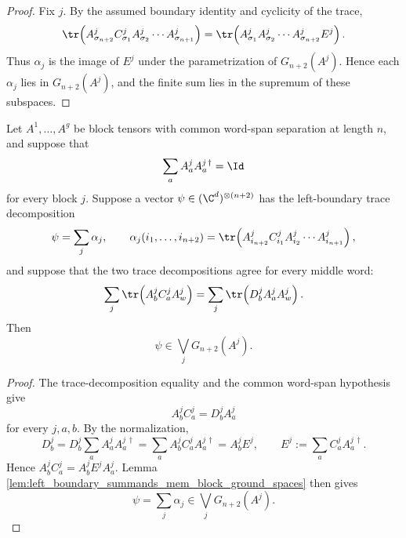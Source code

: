 \begin{proof}
    \leanok
    Fix $j$.  By the assumed boundary identity and cyclicity of the
    trace,
    \[
        \tr\!\left(
        A^j_{\sigma_{n+2}} C^j_{\sigma_1}
        A^j_{\sigma_2}\cdots A^j_{\sigma_{n+1}}
        \right)
        =
        \tr\!\left(
        A^j_{\sigma_1}A^j_{\sigma_2}\cdots
        A^j_{\sigma_{n+2}}E^j
        \right).
    \]
    Thus $\alpha_j$ is the image of $E^j$ under the parametrization
    of $G_{n+2}(A^j)$.  Hence each $\alpha_j$ lies in
    $G_{n+2}(A^j)$, and the finite sum lies in the supremum of these
    subspaces.
\end{proof}

\begin{lemma}
    \label{lem:left_boundary_trace_decomposition_mem_block_ground_spaces}
    \leanok
    Let $A^1,\ldots,A^g$ be block tensors with common word-span separation at
    length $n$, and suppose that
    \[
        \sum_a A^j_a A^{j\,\dagger}_a=\Id
    \]
    for every block $j$.  Suppose a vector $\psi\in(\C^d)^{\otimes(n+2)}$
    has the left-boundary trace decomposition
    \[
        \psi=\sum_j\alpha_j,
        \qquad
        \alpha_j(i_1,\ldots,i_{n+2})
        =
        \tr\!\left(
        A^j_{i_{n+2}} C^j_{i_1}
        A^j_{i_2}\cdots A^j_{i_{n+1}}
        \right),
    \]
    and suppose that the two trace decompositions agree for every middle word:
    \[
        \sum_j
        \tr\!\left(
        A^j_b C^j_a A^j_w
        \right)
        =
        \sum_j
        \tr\!\left(
        D^j_b A^j_a A^j_w
        \right).
    \]
    Then
    \[
        \psi\in\bigvee_j G_{n+2}(A^j).
    \]
\end{lemma}

\begin{proof}
    \leanok
    The trace-decomposition equality and the common word-span hypothesis give
    \[
        A^j_bC^j_a=D^j_bA^j_a
    \]
    for every $j,a,b$.  By the normalization,
    \[
        D^j_b
        =
        D^j_b\sum_a A^j_aA^{j\,\dagger}_a
        =
        \sum_a A^j_bC^j_aA^{j\,\dagger}_a
        =
        A^j_bE^j,
        \qquad
        E^j:=\sum_a C^j_aA^{j\,\dagger}_a.
    \]
    Hence $A^j_bC^j_a=A^j_bE^jA^j_a$.  Lemma
    \ref{lem:left_boundary_summands_mem_block_ground_spaces} then gives
    \[
        \psi=\sum_j\alpha_j\in\bigvee_j G_{n+2}(A^j).
    \]
\end{proof}

